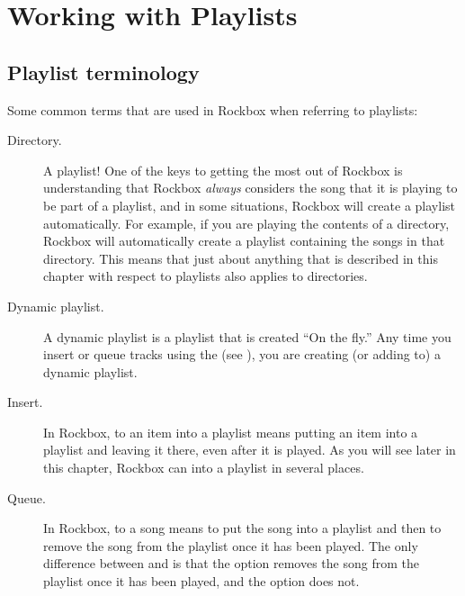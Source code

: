 \section{\label{ref:working_with_playlists}Working with Playlists}

\subsection{Playlist terminology}
Some common terms that are used in Rockbox when referring to
playlists:

\begin{description}
\item[Directory.] A playlist! One of the keys to getting the most out of
  Rockbox is understanding that Rockbox \emph{always} considers the song that
  it is playing to be part of a playlist, and in some situations, Rockbox will
  create a playlist automatically. For example, if you are playing the
  contents of a directory, Rockbox will automatically create a playlist
  containing the songs in that directory. This means that just about anything
  that is described in this chapter with respect to playlists also applies to
  directories.

\item[Dynamic playlist.]  A dynamic playlist is a playlist that is created
  ``On the fly.'' Any time you insert or queue tracks using the
   (see ), you are
  creating (or adding to) a dynamic playlist.

\item[Insert.] In Rockbox, to  an item into a playlist means
  putting an item into a playlist and leaving it there, even after it is
  played. As you will see later in this chapter, Rockbox can 
  into a playlist in several places.

\item[Queue.] In Rockbox, to  a song means to put the song
  into a playlist and then to remove the song from the playlist once it has
  been played. The only difference between  and
   is that the  option removes the song from the
  playlist once it has been played, and the  option does not.
\end{description}

